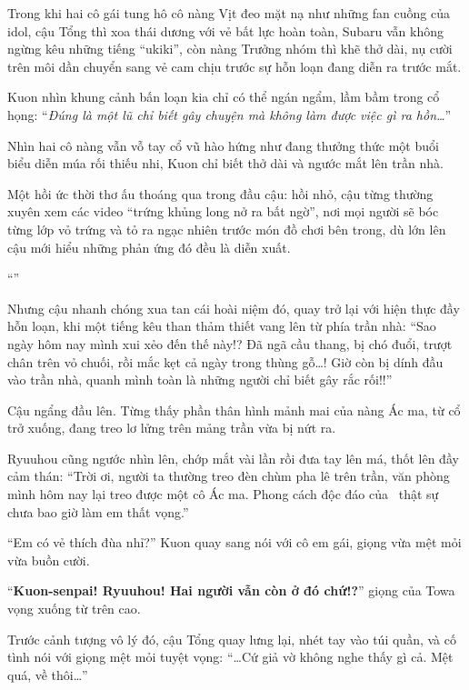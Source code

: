 \documentclass[../main.tex]{subfiles}
\begin{document}
Trong khi hai cô gái tung hô cô nàng Vịt đeo mặt nạ như những fan cuồng của idol, cậu Tổng thì xoa thái dương với vẻ bất lực hoàn toàn, Subaru vẫn không ngừng kêu những tiếng ``ukiki'', còn nàng Trưởng nhóm thì khẽ thở dài, nụ cười trên môi dần chuyển sang vẻ cam chịu trước sự hỗn loạn đang diễn ra trước mắt.

Kuon nhìn khung cảnh bấn loạn kia chỉ có thể ngán ngẩm, lầm bầm trong cổ họng: ``\textit{Đúng là một lũ chỉ biết gây chuyện mà không làm được việc gì ra hồn\dots}''


\omk

Nhìn hai cô nàng vẫn vỗ tay cổ vũ hào hứng như đang thưởng thức một buổi biểu diễn múa rối thiếu nhi, Kuon chỉ biết thở dài và ngước mắt lên trần nhà.

Một hồi ức thời thơ ấu thoáng qua trong đầu cậu: hồi nhỏ, cậu từng thường xuyên xem các video ``trứng khủng long nở ra bất ngờ'', nơi mọi người sẽ bóc từng lớp vỏ trứng và tỏ ra ngạc nhiên trước món đồ chơi bên trong, dù lớn lên cậu mới hiểu những phản ứng đó đều là diễn xuất.

``''

Nhưng cậu nhanh chóng xua tan cái hoài niệm đó, quay trở lại với hiện thực đầy hỗn loạn, khi một tiếng kêu than thảm thiết vang lên từ phía trần nhà: ``Sao ngày hôm nay mình xui xẻo đến thế này!? Đã ngã cầu thang, bị chó đuổi, trượt chân trên vỏ chuối, rồi mắc kẹt cả ngày trong thùng gỗ\dots! Giờ còn bị dính đầu vào trần nhà, quanh mình toàn là những người chỉ biết gây rắc rối!!''

Cậu ngẩng đầu lên. Từng thấy phần thân hình mảnh mai của nàng Ác ma, từ cổ trở xuống, đang treo lơ lửng trên mảng trần vừa bị nứt ra.

Ryuuhou cũng ngước nhìn lên, chớp mắt vài lần rồi đưa tay lên má, thốt lên đầy cảm thán: ``Trời ơi, người ta thường treo đèn chùm pha lê trên trần, văn phòng mình hôm nay lại treo được một cô Ác ma. Phong cách độc đáo của \hll\ thật sự chưa bao giờ làm em thất vọng.''

``Em có vẻ thích đùa nhỉ?'' Kuon quay sang nói với cô em gái, giọng vừa mệt mỏi vừa buồn cười.

``\textbf{Kuon-senpai! Ryuuhou! Hai người vẫn còn ở đó chứ!?}'' giọng của Towa vọng xuống từ trên cao.

Trước cảnh tượng vô lý đó, cậu Tổng quay lưng lại, nhét tay vào túi quần, và cố tình nói với giọng mệt mỏi tuyệt vọng: ``\dots Cứ giả vờ không nghe thấy gì cả. Mệt quá, về thôi\dots''
\end{document}
